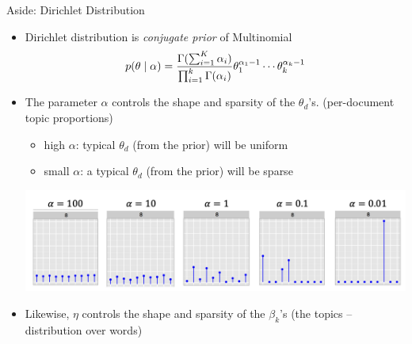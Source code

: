 \documentclass[10pt]{beamer}
\begin{document}
\begin{frame}{Aside: Dirichlet Distribution}

\begin{itemize}
\item Dirichlet distribution is \textit{conjugate prior} of Multinomial
\[  p(\theta \; | \; \alpha)  = \displaystyle\frac{\Gamma (\sum_{i=1}^K \alpha_i)}{ \prod_{i=1}^k \Gamma(\alpha_i)}  \theta_1^{\alpha_1 -1 } \cdots  \theta_k^{\alpha_k -1 }  \]
\item The parameter $\alpha$ controls the shape and sparsity of the $\theta_d$'s. \tiny(per-document topic proportions) \normalsize
	\begin{itemize}
	\item high $\alpha$:  typical $\theta_d$ \tiny (from the prior) \normalsize will be uniform
	\item small $\alpha$: a typical $\theta_d$ \tiny (from the prior) \normalsize will be sparse
	\end{itemize}
	\begin{center}
	\includegraphics[width=.8\textwidth]{images/dirichlet_role_of_hyperparameter}
	\end{center}
\item Likewise, $\eta$ controls the shape and sparsity of the $\beta_k$'s \tiny(the topics -- distribution over words) \normalsize
\end{itemize}
\end{frame}
\end{document}
